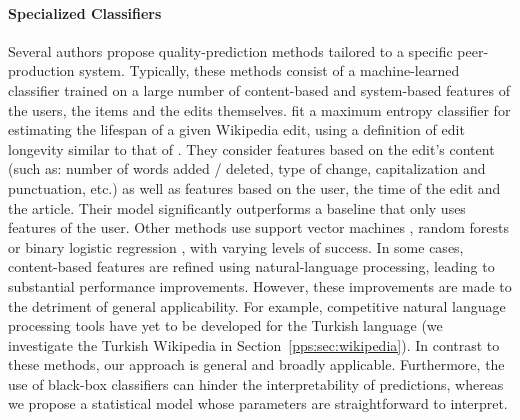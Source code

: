 \paragraph{Specialized Classifiers}
Several authors propose quality-prediction methods tailored to a specific peer-production system.
Typically, these methods consist of a machine-learned classifier trained on a large number of content-based and system-based features of the users, the items and the edits themselves.
\citet{druck2008learning} fit a maximum entropy classifier for estimating the lifespan of a given Wikipedia edit, using a definition of edit longevity similar to that of \citet{adler2007content}.
They consider features based on the edit's content (such as: number of words added / deleted, type of change, capitalization and punctuation, etc.) as well as features based on the user, the time of the edit and the article.
Their model significantly outperforms a baseline that only uses features of the user.
Other methods use support vector machines \citep{bronner2012user}, random forests \citep{bronner2012user, javanmardi2011vandalism} or binary logistic regression \citep{potthast2008automatic}, with varying levels of success.
In some cases, content-based features are refined using natural-language processing, leading to substantial performance improvements.
However, these improvements are made to the detriment of general applicability.
For example, competitive natural language processing tools have yet to be developed for the Turkish language (we investigate the Turkish Wikipedia in Section~\ref{pps:sec:wikipedia}).
In contrast to these methods, our approach is general and broadly applicable.
Furthermore, the use of black-box classifiers can hinder the interpretability of predictions, whereas we propose a statistical model whose parameters are straightforward to interpret.

